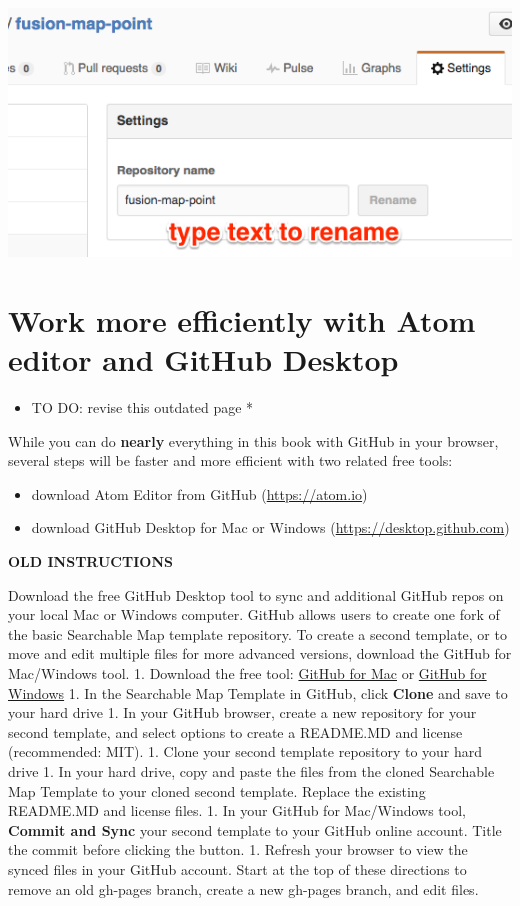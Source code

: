 \documentclass[
  english,
]{book}
\providecommand{\tightlist}{%
  \setlength{\itemsep}{0pt}\setlength{\parskip}{0pt}}
\begin{document}
\includegraphics{images/08-github/Github-settings-rename.png}

\hypertarget{atom-desktop}{%
\section{Work more efficiently with Atom editor and GitHub Desktop}\label{atom-desktop}}

\begin{itemize}
\tightlist
\item
  TO DO: revise this outdated page *
\end{itemize}

While you can do \textbf{nearly} everything in this book with GitHub in your browser, several steps will be faster and more efficient with two related free tools:

\begin{itemize}
\item
  download Atom Editor from GitHub (\url{https://atom.io})
\item
  download GitHub Desktop for Mac or Windows (\url{https://desktop.github.com})
\end{itemize}

\textbf{OLD INSTRUCTIONS}

Download the free GitHub Desktop tool to sync and additional GitHub repos on your local Mac or Windows computer.
GitHub allows users to create one fork of the basic Searchable Map template repository. To create a second template, or to move and edit multiple files for more advanced versions, download the GitHub for Mac/Windows tool.
1. Download the free tool: \href{https://mac.github.com/}{GitHub for Mac} or \href{https://windows.github.com/}{GitHub for Windows}
1. In the Searchable Map Template in GitHub, click \textbf{Clone} and save to your hard drive
1. In your GitHub browser, create a new repository for your second template, and select options to create a README.MD and license (recommended: MIT).
1. Clone your second template repository to your hard drive
1. In your hard drive, copy and paste the files from the cloned Searchable Map Template to your cloned second template. Replace the existing README.MD and license files.
1. In your GitHub for Mac/Windows tool, \textbf{Commit and Sync} your second template to your GitHub online account. Title the commit before clicking the button.
1. Refresh your browser to view the synced files in your GitHub account. Start at the top of these directions to remove an old gh-pages branch, create a new gh-pages branch, and edit files.
\end{document}
